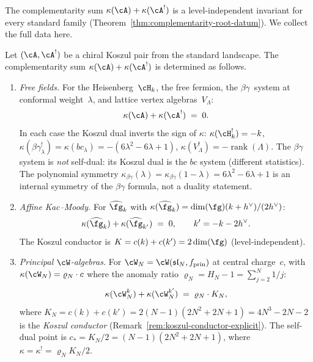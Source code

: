 The complementarity sum $\kappa(\cA) + \kappa(\cA^!)$ is a
level-independent invariant for every standard family
(Theorem~\ref{thm:complementarity-root-datum}). We collect the
full data here.

\begin{proposition}
\label{prop:complementarity-landscape}
Let $(\cA, \cA^!)$ be a chiral Koszul pair from the standard
landscape. The complementarity sum
$\kappa(\cA) + \kappa(\cA^!)$ is determined as follows.
\begin{enumerate}[label=\textup{(\roman*)}]
\item \emph{Free fields.}\;
 For the Heisenberg~$\cH_k$, the free fermion, the
 $\beta\gamma$~system at conformal weight~$\lambda$, and
 lattice vertex algebras~$V_\Lambda$:
 \begin{equation}\label{eq:free-field-antisymmetry}
 \kappa(\cA) + \kappa(\cA^!) \;=\; 0.
 \end{equation}
 In each case the Koszul dual inverts the sign of $\kappa$:
 $\kappa(\cH_k^!) = -k$,\;
 $\kappa(\beta\gamma_\lambda^!) = \kappa(bc_\lambda)
 = -(6\lambda^2 - 6\lambda + 1)$,\;
 $\kappa(V_\Lambda^!) = -\operatorname{rank}(\Lambda)$.
 The $\beta\gamma$ system is \emph{not} self-dual: its Koszul
 dual is the $bc$ system \textup{(}different statistics\textup{)}. The
 polynomial symmetry
 $\kappa_{\beta\gamma}(\lambda)
 = \kappa_{\beta\gamma}(1-\lambda) = 6\lambda^2 - 6\lambda + 1$
 is an internal symmetry of the $\beta\gamma$ formula, not a
 duality statement.

\item \emph{Affine Kac--Moody.}\;
 For $\widehat{\fg}_k$ with
 $\kappa(\widehat{\fg}_k)
 = \dim(\fg)(k + h^\vee)/(2h^\vee)$:
 \begin{equation}\label{eq:km-antisymmetry}
 \kappa(\widehat{\fg}_k)
 + \kappa(\widehat{\fg}_{k'}) \;=\; 0,
 \qquad k' = -k - 2h^\vee.
 \end{equation}
 The Koszul conductor is
 $K = c(k) + c(k') = 2\dim(\fg)$
 \textup{(}level-independent\textup{)}.

\item \emph{Principal $\cW$-algebras.}\;
 For $\cW_N = \cW(\mathfrak{sl}_N, f_{\mathrm{prin}})$
 at central charge~$c$, with
 $\kappa(\cW_N) = \varrho_N \cdot c$ where the anomaly ratio
 $\varrho_N = H_N - 1 = \sum_{j=2}^{N} 1/j$:
 \begin{equation}\label{eq:wn-complementarity-sum}
 \kappa(\cW_N^k) + \kappa(\cW_N^{k'})
 \;=\; \varrho_N \cdot K_N,
 \end{equation}
 where $K_N = c(k) + c(k') = 2(N{-}1)(2N^2{+}2N{+}1)
 = 4N^3 - 2N - 2$ is the \emph{Koszul conductor}
 \textup{(}Remark~\textup{\ref{rem:koszul-conductor-explicit})}.
 The self-dual point is
 $c_* = K_N/2 = (N{-}1)(2N^2{+}2N{+}1)$, where
 $\kappa = \kappa^! = \varrho_N K_N/2$.
\end{enumerate}
\end{proposition}

